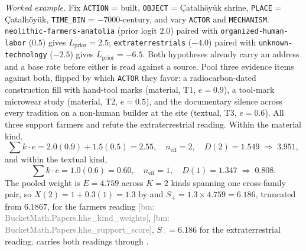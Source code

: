 \documentclass[11pt]{article}
\newcommand{\bm}[1]{\textcolor{gray}{\footnotesize [bm: #1]}}
\begin{document}
\emph{Worked example.} Fix \texttt{ACTION} = built, \texttt{OBJECT} =
Çatalhöyük shrine, \texttt{PLACE} = Çatalhöyük, \texttt{TIME\_BIN} =
$-7000$-century, and vary \texttt{ACTOR} and \texttt{MECHANISM}.
\texttt{neolithic-farmers-anatolia} (prior logit $2.0$) paired with
\texttt{organized-human-labor} ($0.5$) gives $L_{\mathrm{prior}} = 2.5$;
\texttt{extraterrestrials} ($-4.0$) paired with \texttt{unknown-
technology} ($-2.5$) gives $L_{\mathrm{prior}} = -6.5$. Both hypotheses
already carry an address and a base rate before either is read against a
source. Pool three evidence items against both, flipped by which
\texttt{ACTOR} they favor: a radiocarbon-dated construction fill with
hand-tool marks (material, T1, $e = 0.9$), a tool-mark microwear study
(material, T2, $e = 0.5$), and the documentary silence across every
tradition on a non-human builder at the site (textual, T3, $e = 0.6$).
All three support farmers and refute the extraterrestrial reading. Within
the material kind,
\begin{equation}
  \label{eq:material-kind}
  \sum k \cdot e = 2.0(0.9) + 1.5(0.5) = 2.55, \quad n_{\mathrm{eff}}=2,
  \quad D(2) = 1.549 \;\Rightarrow\; 3.951,
\end{equation}
and within the textual kind,
\begin{equation}
  \label{eq:textual-kind}
  \sum k \cdot e = 1.0(0.6) = 0.60, \quad n_{\mathrm{eff}}=1,
  \quad D(1) = 1.347 \;\Rightarrow\; 0.808.
\end{equation}
The pooled weight is $E = 4.759$ across $K=2$ kinds spanning one
cross-family pair, so $X(2) = 1 + 0.3(1) = 1.3$ by 
and $S_{+} = 1.3 \times 4.759 = 6.186$, truncated from $6.1867$, for the farmers reading \bm{BucketMath.Papers.hhe\_kind\_weights}, \bm{BucketMath.Papers.hhe\_support\_score},
$S_{-} = 6.186$ for the extraterrestrial reading. 
carries both readings through .
\end{document}
